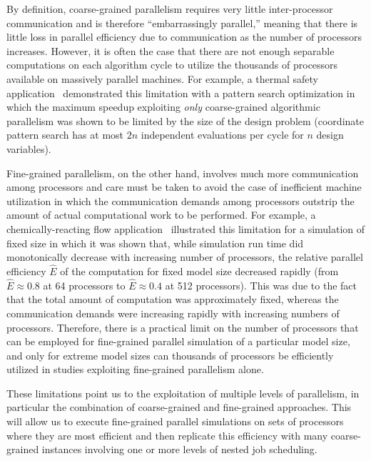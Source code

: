 By definition, coarse-grained parallelism requires very little
inter-processor communication and is therefore ``embarrassingly
parallel,'' meaning that there is little loss in parallel efficiency
due to communication as the number of processors increases. However,
it is often the case that there are not enough separable computations
on each algorithm cycle to utilize the thousands of processors
available on massively parallel machines. For example, a thermal safety
application~\cite{Eld96a} demonstrated this limitation with a pattern
search optimization in which the maximum speedup exploiting
\emph{only} coarse-grained algorithmic parallelism was shown to be
limited by the size of the design problem (coordinate pattern search
has at most $2n$ independent evaluations per cycle for $n$ design
variables).

Fine-grained parallelism, on the other hand, involves much more
communication among processors and care must be taken to avoid the
case of inefficient machine utilization in which the communication
demands among processors outstrip the amount of actual computational
work to be performed. For example, a chemically-reacting flow
application~\cite{Eld98a} illustrated this limitation for a simulation
of fixed size in which it was shown that, while simulation run time
did monotonically decrease with increasing number of processors, the
relative parallel efficiency $\hat{E}$ of the computation for fixed
model size decreased rapidly (from $\hat{E} \approx 0.8$ at 64
processors to $\hat{E} \approx 0.4$ at 512 processors). This was due
to the fact that the total amount of computation was approximately
fixed, whereas the communication demands were increasing rapidly with
increasing numbers of processors. Therefore, there is a practical
limit on the number of processors that can be employed for
fine-grained parallel simulation of a particular model size, and only
for extreme model sizes can thousands of processors be efficiently
utilized in studies exploiting fine-grained parallelism alone.

These limitations point us to the exploitation of multiple levels of
parallelism, in particular the combination of coarse-grained and
fine-grained approaches. This will allow us to execute fine-grained
parallel simulations on sets of processors where they are most
efficient and then replicate this efficiency with many coarse-grained
instances involving one or more levels of nested job scheduling.  

